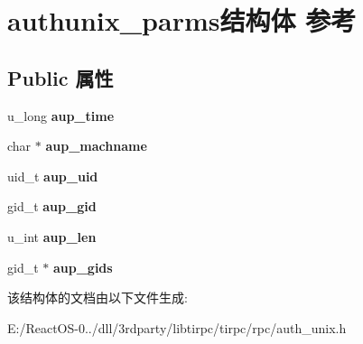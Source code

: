 \hypertarget{structauthunix__parms}{}\section{authunix\+\_\+parms结构体 参考}
\label{structauthunix__parms}
\subsection*{Public 属性}
\begin{DoxyCompactItemize}
\item 
\mbox{\label{structauthunix__parms_a81caaa8d74b300ceed723bf17ad4f50e}} 
u\+\_\+long {\bfseries aup\+\_\+time}
\item 
\mbox{\label{structauthunix__parms_a70e3538b11d28ae4da3302942c3cd1d8}} 
char $\ast$ {\bfseries aup\+\_\+machname}
\item 
\mbox{\label{structauthunix__parms_a5ee1667dd754c9f391935e4fa35e4b63}} 
uid\+\_\+t {\bfseries aup\+\_\+uid}
\item 
\mbox{\label{structauthunix__parms_a8518e68eb0206d311b8bcf51a3af0c17}} 
gid\+\_\+t {\bfseries aup\+\_\+gid}
\item 
\mbox{\label{structauthunix__parms_afab6a291b0538e51129844ec481ca090}} 
u\+\_\+int {\bfseries aup\+\_\+len}
\item 
\mbox{\label{structauthunix__parms_a1a520fc4f1e0314372dde731fcf9818e}} 
gid\+\_\+t $\ast$ {\bfseries aup\+\_\+gids}
\end{DoxyCompactItemize}


该结构体的文档由以下文件生成\+:\begin{DoxyCompactItemize}
\item 
E\+:/\+React\+O\+S-\/0../dll/3rdparty/libtirpc/tirpc/rpc/auth\+\_\+unix.\+h\end{DoxyCompactItemize}
